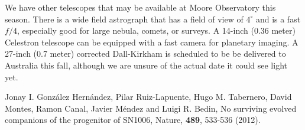 \documentclass[dvips,12pt]{article}
\begin{document}
We have other telescopes that may be available at Moore Observatory this season.
There is a wide field astrograph that has a field of view of $4^\circ$ and is a
fast $f/4$,  especially good for large nebula, comets, or surveys.  A 14-inch
(0.36 meter) Celestron  telescope can be equipped with a fast camera for
planetary imaging.  A 27-inch (0.7 meter)  corrected Dall-Kirkham is scheduled
to be be delivered to Australia this fall, although we are unsure of the actual
date it could see light yet.  


 
\begin{thebibliography}{99}

 Jonay I. Gonz\'{a}lez Hern\'{a}ndez, 
Pilar Ruiz-Lapuente,    
Hugo M. Tabernero,  
David Montes,   
Ramon Canal,    
Javier M\'{e}ndez   
and Luigi R. Bedin,
{No surviving evolved companions of the progenitor of SN1006},
Nature, {\bf 489}, 533-536 (2012).

\end{thebibliography}

\fi
\end{document}
